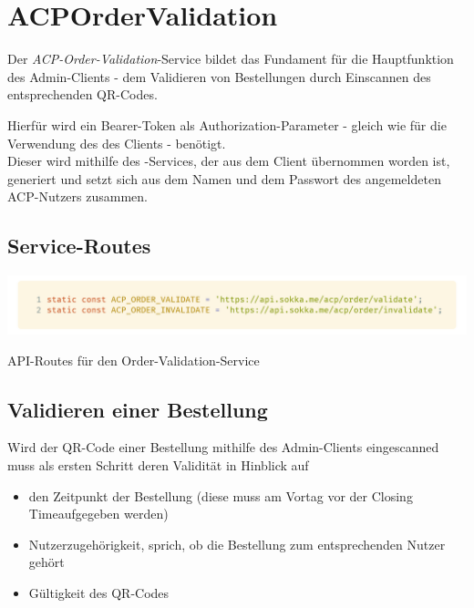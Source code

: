 \section{ACPOrderValidation}

Der \textit{ACP-Order-Validation}-Service bildet das Fundament für die Hauptfunktion des Admin-Clients -
dem Validieren von Bestellungen durch Einscannen des entsprechenden QR-Codes.

Hierfür wird ein Bearer-Token als Authorization-Parameter - gleich wie für die Verwendung des 
 des Clients - benötigt.\\
Dieser wird mithilfe des -Services, der aus dem Client übernommen worden ist,
generiert und setzt sich aus dem Namen und dem Passwort des angemeldeten ACP-Nutzers zusammen.

\subsection{Service-Routes}

\begin{code}[H]
    \centering
    \includegraphics[width=1\textwidth]{images/Admin-Client/services/acpordervalidation/routes.png}
    \vspace{-25pt}
    \caption{API-Routes für den Order-Validation-Service}
\end{code}

\subsection{Validieren einer Bestellung}

Wird der QR-Code einer Bestellung mithilfe des Admin-Clients eingescanned muss als ersten Schritt deren
Validität in Hinblick auf 

\begin{itemize}
    \item den Zeitpunkt der Bestellung (diese muss am Vortag vor der \glqq Closing Time\grqq aufgegeben werden)
    \item Nutzerzugehörigkeit, sprich, ob die Bestellung zum entsprechenden Nutzer gehört
    \item Gültigkeit des QR-Codes
\end{itemize}

